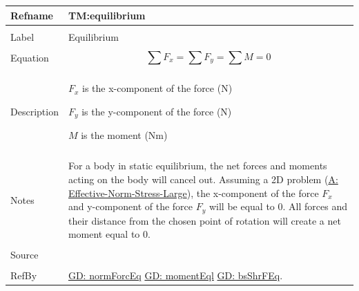 \documentclass[12pt]{article}
\begin{document}
\noindent \begin{minipage}{\textwidth}
\begin{tabular}{p{} p{}}
\toprule \textbf{Refname} & \textbf{TM:equilibrium}
\label{TM:equilibrium}
\\ \midrule \\
Label & Equilibrium
\\ \midrule \\
Equation & \begin{displaymath}
           \displaystyle\sum{{F_{x}}}=\displaystyle\sum{{F_{y}}}=\displaystyle\sum{M}=0
           \end{displaymath}
\\ \midrule \\
Description & \begin{symbDescription}
              \item{${F_{x}}$ is the x-component of the force (N)}
              \item{${F_{y}}$ is the y-component of the force (N)}
              \item{$M$ is the moment (Nm)}
              \end{symbDescription}
\\ \midrule \\
Notes & For a body in static equilibrium, the net forces and moments acting on the body will cancel out. Assuming a 2D problem (\hyperref[assumpENSL]{A: Effective-Norm-Stress-Large}), the x-component of the force ${F_{x}}$ and y-component of the force ${F_{y}}$ will be equal to $0$. All forces and their distance from the chosen point of rotation will create a net moment equal to $0$.
\\ \midrule \\
Source & \cite{fredlund1977}
\\ \midrule \\
RefBy & \hyperref[GD:normForcEq]{GD: normForcEq} \hyperref[GD:momentEql]{GD: momentEql} \hyperref[GD:bsShrFEq]{GD: bsShrFEq}.
\\ \bottomrule \end{tabular}
\end{minipage}
\par~
\end{document}
